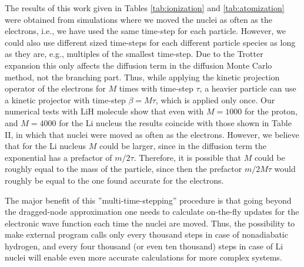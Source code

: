 The results of this work given in Tables \ref{tab:ionization} and \ref{tab:atomization} were obtained from simulations where we moved the nuclei as often as the electrons, i.e., we have used the same time-step for each particle. However, we could also use different sized time-steps for each different particle species as long as they are, e.g., multiples of the smallest time-step. Due to the Trotter expansion \cite{lester1} this only affects the diffusion term in the diffusion Monte Carlo method, not the branching part. Thus, while applying the kinetic projection operator of the electrons for $M$ times with time-step $\tau$, a heavier particle can use a kinetic projector with time-step $\beta=M\tau$, which is applied only once. Our numerical tests with LiH molecule show that even with $M=1000$ for the proton, and $M=4000$ for the Li nucleus the results coincide with those shown in Table II, in which that nuclei were moved as often as the electrons. However, we believe that for the Li nucleus $M$ could be larger, since in the diffusion term the exponential has a prefactor of $m/2\tau$. Therefore, it is possible that $M$ could be roughly equal to the mass of the particle, since then the prefactor $m/2M\tau$ would roughly be equal to the one found accurate for the electrons.

The major benefit of this ''multi-time-stepping'' procedure is that going beyond the dragged-node approximation one needs to calculate on-the-fly updates for the electronic wave function each time the nuclei are moved. Thus, the possibility to make external program calls only every thousand steps in case of nonadiabatic hydrogen, and every four thousand (or even ten thousand) steps in case of Li nuclei will enable even more accurate calculations for more complex systems.